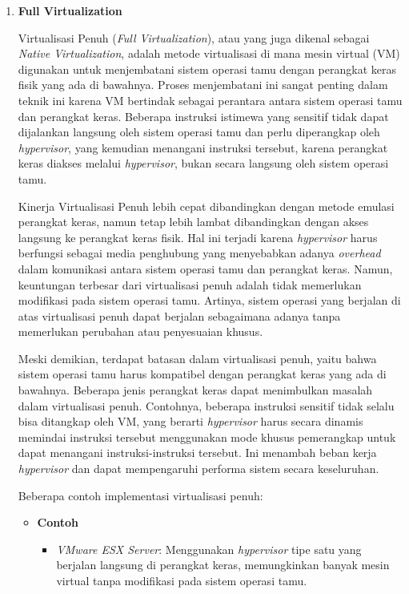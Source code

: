 \documentclass[12pt]{article}
\begin{document}
\begin{enumerate}
    \item \textbf{Full Virtualization}
    \par Virtualisasi Penuh (\textit{Full Virtualization}), atau yang juga dikenal sebagai \textit{Native Virtualization}, adalah metode virtualisasi di mana mesin virtual (VM) digunakan untuk menjembatani sistem operasi tamu dengan perangkat keras fisik yang ada di bawahnya. Proses menjembatani ini sangat penting dalam teknik ini karena VM bertindak sebagai perantara antara sistem operasi tamu dan perangkat keras. Beberapa instruksi istimewa yang sensitif tidak dapat dijalankan langsung oleh sistem operasi tamu dan perlu diperangkap oleh \textit{hypervisor}, yang kemudian menangani instruksi tersebut, karena perangkat keras diakses melalui \textit{hypervisor}, bukan secara langsung oleh sistem operasi tamu.
    
    \par Kinerja Virtualisasi Penuh lebih cepat dibandingkan dengan metode emulasi perangkat keras, namun tetap lebih lambat dibandingkan dengan akses langsung ke perangkat keras fisik. Hal ini terjadi karena \textit{hypervisor} harus berfungsi sebagai media penghubung yang menyebabkan adanya \textit{overhead} dalam komunikasi antara sistem operasi tamu dan perangkat keras. Namun, keuntungan terbesar dari virtualisasi penuh adalah tidak memerlukan modifikasi pada sistem operasi tamu. Artinya, sistem operasi yang berjalan di atas virtualisasi penuh dapat berjalan sebagaimana adanya tanpa memerlukan perubahan atau penyesuaian khusus.
    
    \par Meski demikian, terdapat batasan dalam virtualisasi penuh, yaitu bahwa sistem operasi tamu harus kompatibel dengan perangkat keras yang ada di bawahnya. Beberapa jenis perangkat keras dapat menimbulkan masalah dalam virtualisasi penuh. Contohnya, beberapa instruksi sensitif tidak selalu bisa ditangkap oleh VM, yang berarti \textit{hypervisor} harus secara dinamis memindai instruksi tersebut menggunakan mode khusus pemerangkap untuk dapat menangani instruksi-instruksi tersebut. Ini menambah beban kerja \textit{hypervisor} dan dapat mempengaruhi performa sistem secara keseluruhan.
    
    \par Beberapa contoh implementasi virtualisasi penuh:
    \begin{itemize}
        \item \textbf{Contoh}
        \begin{itemize}
            \item \textit{VMware ESX Server}: Menggunakan \textit{hypervisor} tipe satu yang berjalan langsung di perangkat keras, memungkinkan banyak mesin virtual tanpa modifikasi pada sistem operasi tamu.
    

\end{itemize}
\end{itemize}
\end{enumerate}
\end{document}
